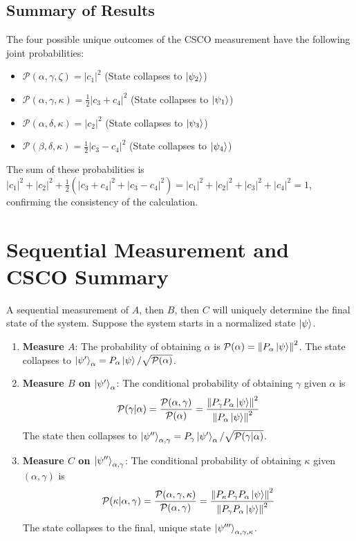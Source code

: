 \documentclass[11pt,a4paper]{article}
\begin{document}
\subsection{Summary of Results}
The four possible unique outcomes of the CSCO measurement have the following
joint probabilities:
\begin{itemize}
  \item $\mathcal{P}(\alpha, \gamma, \zeta) = |c_1|^2$  (State collapses to
    $\ket{\psi_2}$)
  \item $\mathcal{P}(\alpha, \gamma, \kappa) = \frac{1}{2}|c_3+c_4|^2$ (State
    collapses to $\ket{\psi_1}$)
  \item $\mathcal{P}(\alpha, \delta, \kappa) = |c_2|^2$ (State collapses to
    $\ket{\psi_3}$)
  \item $\mathcal{P}(\beta, \delta, \kappa) = \frac{1}{2}|c_3-c_4|^2$ (State
    collapses to $\ket{\psi_4}$)
\end{itemize}
The sum of these probabilities is $|c_1|^2 + |c_2|^2 +
\frac{1}{2}(|c_3+c_4|^2+|c_3-c_4|^2) = |c_1|^2+|c_2|^2+|c_3|^2+|c_4|^2 = 1$,
confirming the consistency of the calculation.

\section{Sequential Measurement and CSCO Summary}

A sequential measurement of $A$, then $B$, then $C$ will uniquely determine the
final state of the system. Suppose the system starts in a normalized state
$\ket{\psi}$.
\begin{enumerate}
  \item \textbf{Measure $A$}: The probability of obtaining $\alpha$ is
    $\mathcal{P}(\alpha) = \norm{P_\alpha\ket{\psi}}^2$. The state collapses to
    $\ket{\psi'}_\alpha = P_\alpha\ket{\psi} / \sqrt{\mathcal{P}(\alpha)}$.
  \item \textbf{Measure $B$ on $\ket{\psi'}_\alpha$}: The conditional
    probability of obtaining $\gamma$ given $\alpha$ is
    $$ \mathcal{P}(\gamma|\alpha) =
    \frac{\mathcal{P}(\alpha,\gamma)}{\mathcal{P}(\alpha)} =
    \frac{\norm{P_\gamma P_\alpha \ket{\psi}}^2}{\norm{P_\alpha \ket{\psi}}^2}
    $$
    The state then collapses to $\ket{\psi''}_{\alpha,\gamma} = P_\gamma
    \ket{\psi'}_\alpha / \sqrt{\mathcal{P}(\gamma|\alpha)}$.
  \item \textbf{Measure $C$ on $\ket{\psi''}_{\alpha,\gamma}$}: The conditional
    probability of obtaining $\kappa$ given $(\alpha,\gamma)$ is
    $$ \mathcal{P}(\kappa|\alpha,\gamma) = \frac{\mathcal{P}(\alpha,\gamma,
    \kappa)}{\mathcal{P}(\alpha,\gamma)} = \frac{\norm{P_\kappa P_\gamma
    P_\alpha \ket{\psi}}^2}{\norm{P_\gamma P_\alpha \ket{\psi}}^2} $$
    The state collapses to the final, unique state
    $\ket{\psi'''}_{\alpha,\gamma,\kappa}$.
\end{enumerate}
\end{document}
